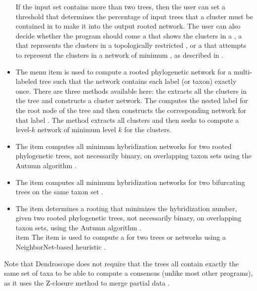 \documentclass[11pt]{article}
\newcommand{\cs}[1]{\textcolor{red}{#1}}
\begin{document}
\begin{itemize}
If the input set contains more than two trees, then the user can set a 
threshold that determines the percentage of input trees that a cluster must be 
contained in to make it into the output rooted network.
The user can also 
decide whether the program should come a  
\cite{ClusterNetworks2008} that shows the clusters in a
, a
 \cite{GalledNetworks2009} that represents the clusters in a 
topologically restricted ,
or a  that attempts to represent the
clusters in a network of minimum ,
as described in \cite{LevelKClusters2010}.
\item
The  menu item is used to compute a rooted
phylogenetic network for a multi-labeled tree such that the network contains each label (or taxon)
exactly once. There are three methods available here: the 
extracts all the clusters in the tree and constructs a cluster network.
The  computes the nested label for the root node of the tree and
then constructs the corresponding network for that label \cite{HOLM2007}.
The  method extracts all clusters and then seeks to compute a level-$k$ network
of minimum level $k$ for the clusters.
\item The  item computes all minimum {hybridization networks} for two rooted
phylogenetic trees, not necessarily binary, on overlapping taxon sets using the Autumn algorithm \cite{HusonLinz2015}.
\item The  item computes all minimum {hybridization networks} for two bifurcating trees on the same taxon set  \cite{Albrecht2012}.
\item The  item determines a rooting that minimizes the
hybridization number, given two rooted
phylogenetic trees, not necessarily binary, on overlapping taxon sets, using the Autumn algorithm \cite{HusonLinz2015}.
\\item The  item is used to compute a  for two trees or networks using a NeighborNet-based heuristic \cite{Tanglegrams}.
\end{itemize}

Note that  Dendroscope does not require that the trees all contain exactly the same set of taxa to be able
to compute a consensus (unlike most other programs), as it uses
the Z-closure method to merge partial data \cite{zclosure}.%
\end{document}
